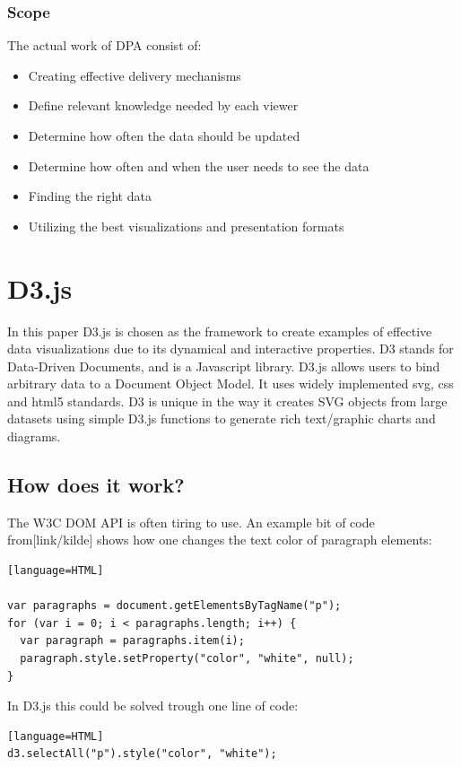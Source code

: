 \subsubsection{Scope}
The actual work of DPA consist of:
\begin{itemize}
\item Creating effective delivery mechanisms
\item Define relevant knowledge needed by each viewer
\item Determine how often the data should be updated
\item Determine how often and when the user needs to see the data
\item Finding the right data
\item Utilizing the best visualizations and presentation formats
\end{itemize}


\section{D3.js}
In this paper D3.js \citep{D3} is chosen as the framework to create examples of effective data visualizations due to its dynamical and interactive properties. 
D3 stands for Data-Driven Documents, and is a Javascript library. 
D3.js allows users to bind arbitrary data to a Document Object Model. It uses widely implemented \gls{svg}, \gls{css} and \gls{html}5 standards. D3 is unique in the way it creates SVG objects from large datasets using simple D3.js functions to generate rich text/graphic charts and diagrams. 


\subsection{How does it work?}
The W3C DOM API is often tiring to use. An example bit of code from[link/kilde] shows how one changes the text color of paragraph elements:

\begin{lstlisting}[caption={HTML example}][language=HTML]

var paragraphs = document.getElementsByTagName("p");
for (var i = 0; i < paragraphs.length; i++) {
  var paragraph = paragraphs.item(i);
  paragraph.style.setProperty("color", "white", null);
}

\end{lstlisting}

In D3.js this could be solved trough one line of code:

\begin{lstlisting}[caption={D3.js example}][language=HTML]
d3.selectAll("p").style("color", "white");
\end{lstlisting}

